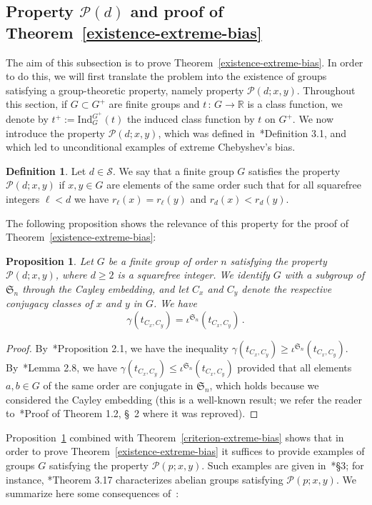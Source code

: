 \documentclass[12pt]{amsart}
\numberwithin{equation}{section}
\newcommand{\R}{\mathbb R}
\newtheorem{prop}[X]{Proposition}
\theoremstyle{definition}
\newtheorem{defi}[X]{Definition}
\theoremstyle{remark}
\begin{document}
\subsection{Property $\mathcal{P}(d)$ and proof of Theorem~\ref{existence-extreme-bias}}\label{subsec:PropP}
The aim of this subsection is to prove Theorem~\ref{existence-extreme-bias}. In order to do this, we will first translate the problem into the existence of groups satisfying a group-theoretic property, namely property $\mathcal{P}(d;x,y)$. Throughout this section, if $G\subset G^+$ are finite groups and $t\, :\,G\to \R$ is a class function, we denote by $t^+:=\mathrm{Ind}_G^{G^+}(t)$ the induced class function by $t$ on $G^+$.
We now introduce the property $\mathcal{P}(d;x,y)$, which was defined in~\cite{Hay}*{Definition 3.1}, and which led to unconditional examples of extreme Chebyshev's bias.
\begin{defi}\label{propertyP(d)}
    Let $d\in \mathcal{S}$. We say that a finite group $G$ satisfies the property $\mathcal{P}(d;x,y)$ if $x,y\in G$ are elements of the same order such that for all squarefree integers $\ell<d$ we have $r_\ell(x)=r_\ell(y)$ and $r_d(x)<r_d(y)$.
\end{defi}
The following proposition shows the relevance of this property for the proof of Theorem~\ref{existence-extreme-bias}:
\begin{prop}\label{cayley}
    Let $G$ be a finite group of order $n$ satisfying the property $\mathcal{P}(d;x,y)$, where $d\ge 2$ is a squarefree integer. We identify $G$ with a subgroup of $\mathfrak{S}_n$ through the Cayley embedding, and let $C_x$ and $C_y$ denote the respective conjugacy classes of $x$ and $y$ in $G$. We have \[\gamma\left( t_{C_x,C_y}\right)=\iota^{\mathfrak{S}_n}\left( t_{C_x,C_y}\right)\, .\]
\end{prop}
\begin{proof}
    By~\cite{Hay}*{Proposition 2.1}, we have the inequality $\gamma\left( t_{C_x,C_y}\right)\ge\iota^{\mathfrak{S}_n}\left( t_{C_x,C_y}\right)$. By~\cite{Hay}*{Lemma 2.8}, we have $\gamma\left( t_{C_x,C_y}\right)\le\iota^{\mathfrak{S}_n}\left( t_{C_x,C_y}\right)$ provided that all elements $a,b\in G$ of the same order are conjugate in $\mathfrak{S}_n$, which holds because we considered the Cayley embedding (this is a well-known result; we refer the reader to~\cite{Hay}*{Proof of Theorem 1.2, \S~2} where it was reproved).
\end{proof}
Proposition~\ref{cayley} combined with Theorem~\ref{criterion-extreme-bias} shows that in order to prove Theorem~\ref{existence-extreme-bias} it suffices to provide examples of groups $G$ satisfying the property $\mathcal{P}(p;x,y)$. Such examples are given in~\cite{Hay}*{\S 3}; for instance, \cite{Hay}*{Theorem 3.17} characterizes abelian groups satisfying $\mathcal{P}(p;x,y)$. We summarize here some consequences of~\cite{Hay}:
\end{document}
